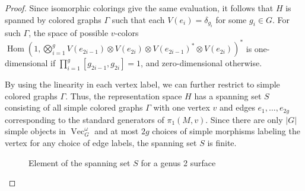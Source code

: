 \documentclass{ws-jktr}
\DeclareMathOperator{\Vect}{Vec}
\DeclareMathOperator{\Hom}{Hom}
\newcommand{\one}{1}
\begin{document}
\begin{proof}
Since isomorphic colorings give the same evaluation, it follows that $H$ is spanned by colored graphs $\Gamma$ such that
each $V(e_i) = \delta_{g_i}$ for some $g_i \in G$.  For such $\Gamma$,  the space of possible $v$-colors $\Hom (\one, \bigotimes_{i=1}^g V(e_{2i-1}) \otimes V(e_{2i})  \otimes V(e_{2i-1})^* \otimes V(e_{2i}))^*$ is one-dimensional if $\prod_{i=1}^g [g_{2i-1}, g_{2i}] = 1$, and zero-dimensional otherwise.

By using the linearity in each vertex label, we can further restrict to simple colored graphs $\Gamma$.  Thus, the representation space $H$ has a spanning set $S$ consisting of all simple colored graphs $\Gamma$ with one vertex $v$ and edges $e_1, \ldots, e_{2g}$ corresponding to the standard generators of $\pi_1(M,v)$.  Since there are only $|G|$ simple objects in $\Vect_G^\omega$ and at most $2g$ choices of simple morphisms labeling the vertex for any choice of edge labels, the spanning set $S$ is finite.

\newdimen\R
\R=0.8cm

\begin{figure}
   \centering
\caption{Element of the spanning set $S$ for a genus 2 surface}
\label{fig:span}
\end{figure}


\end{proof}
\end{document}
